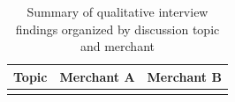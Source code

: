 \documentclass{imc-inf}
\begin{document}
\small
\renewcommand{\arraystretch}{1.3}
\begin{longtable}{@{}>{\raggedright\arraybackslash}p{3cm}p{5.75cm}p{5.75cm}@{}}
  \caption{Summary of qualitative interview findings organized by discussion topic and merchant}
  \label{tab:qualitative-findings}                                                                                                                                                                                                                                                                                                                                                                                                                                                                                                                                                                                                                                                                                                                                                                                                                                                                                                                         \\
  \toprule
  \textbf{Topic}                                                                                                                                                                                                                                                                                                                                                                                                                                                                                                                                                                                                                                                                                                                                                                                                                                                                                               & \textbf{Merchant A} & \textbf{Merchant B} \\
  \midrule
  \endfirsthead
  \multicolumn{3}{c}{\small\textit{\tablename\ \thetable{} -- continued}}                                                                                                                                                                                                                                                                                                                                                                                                                                                                                                                                                                                                                                                                                                                                                                                                                                                                                  \\

\end{longtable}
\end{document}
